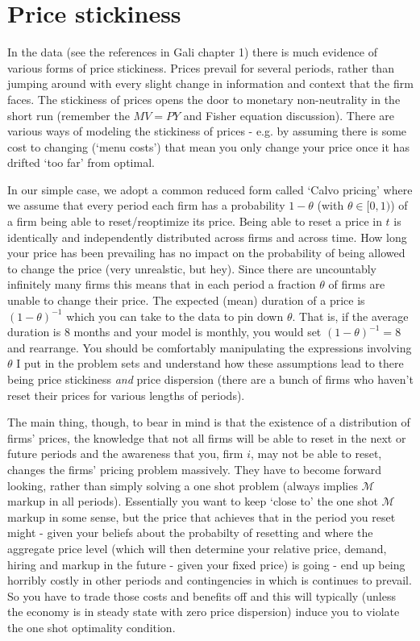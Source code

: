 \documentclass[authoryear,11pt]{elsarticle}
\begin{document}
\section{Price stickiness}
In the data (see the references in Gali chapter 1) there is much evidence of various forms of price stickiness. Prices prevail for several periods, rather than jumping around with every slight change in information and context that the firm faces. The stickiness of prices opens the door to monetary non-neutrality in the short run (remember the $MV=PY$ and Fisher equation discussion). There are various ways of modeling the stickiness of prices - e.g. by assuming there is some cost to changing (`menu costs') that mean you only change your price once it has drifted `too far' from optimal. 

In our simple case, we adopt a common reduced form called `Calvo pricing' where we assume that every period each firm has a probability $1-\theta$ (with $\theta \in [0,1)$) of a firm being able to reset/reoptimize its price. Being able to reset a price in $t$ is identically and independently distributed across firms and across time. How long your price has been prevailing has no impact on the probability of being allowed to change the price (very unrealstic, but hey). Since there are uncountably infinitely many firms this means that in each period a fraction $\theta$ of firms are unable to change their price. The expected (mean) duration of a price is $(1-\theta)^{-1}$ which you can take to the data to pin down $\theta$. That is, if the average duration is $8$ months and your model is monthly, you would set $(1-\theta)^{-1} = 8$ and rearrange. You should be comfortably manipulating the expressions involving $\theta$ I put in the problem sets and understand how these assumptions lead to there being price stickiness \textit{and} price dispersion (there are a bunch of firms who haven't reset their prices for various lengths of periods).

The main thing, though, to bear in mind is that the existence of a distribution of firms' prices, the knowledge that not all firms will be able to reset in the next or future periods and the awareness that you, firm $i$, may not be able to reset, changes the firms' pricing problem massively. They have to become forward looking, rather than simply solving a one shot problem (always implies $\mathcal{M}$ markup in all periods). Essentially you want to keep `close to' the one shot $\mathcal{M}$ markup in some sense, but the price that achieves that in the period you reset might - given your beliefs about the probabilty of resetting and where the aggregate price level (which will then determine your relative price, demand, hiring and markup in the future - given your fixed price) is going - end up being horribly costly in other periods and contingencies in which is continues to prevail. So you have to trade those costs and benefits off and this will typically (unless the economy is in steady state with zero price dispersion) induce you to violate the one shot optimality condition.
\end{document}
